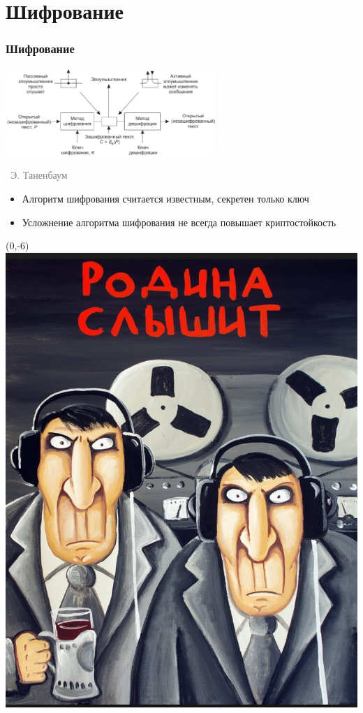 \documentclass[xetex,mathserif,serif]{beamer}
\newcommand{\attribution}[1] {
\vspace{-5mm}\begin{flushright}\begin{scriptsize}\textcolor{gray}{\textcopyright\, #1}\end{scriptsize}\end{flushright}
}
\begin{document}
    \section{Шифрование}

    \begin{frame}
        \frametitle{Шифрование}
        \begin{center}
            \includegraphics[width=0.6\textwidth]{cryptography.png}
            \attribution{Э. Таненбаум}
        \end{center}
        \begin{itemize}
            \item Алгоритм шифрования считается известным, секретен только ключ
            \item Усложнение алгоритма шифрования не всегда повышает криптостойкость
        \end{itemize}
        \begin{textblock}{2}(0,-6)
            \includegraphics[width=\textwidth]{youAreBeingWatched.png}
        \end{textblock}
    \end{frame}
\end{document}
